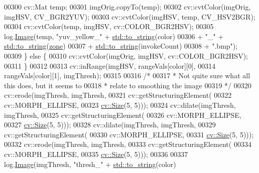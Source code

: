 \begin{DoxyCode}
00300                 cv::Mat temp;
00301                 imgOrig.copyTo(temp);
00302                 cv::cvtColor(imgOrig, imgHSV, CV\_BGR2YUV);
00303                 cv::cvtColor(imgHSV, temp, CV\_HSV2BGR);
00304                 cv::cvtColor(temp, imgHSV, cv::COLOR\_BGR2HSV);
00305                 log.\hyperlink{classChipChipArray_1_1Log_a65bbab057c8b1453f9e4efcfee7522c4}{Image}(temp, \textcolor{stringliteral}{"yuv\_yellow\_"} + \hyperlink{namespacestd_aa5ddf582a1c96ffe258c997be9a294a3}{std::to\_string}(color)
00306                         + \textcolor{stringliteral}{"\_"} + \hyperlink{namespacestd_aa5ddf582a1c96ffe258c997be9a294a3}{std::to\_string}(\hyperlink{classChipChipArray_1_1Grabber_ab57efe6e0b6f369b19528285a278d967}{zone})
00307                         + \hyperlink{namespacestd_aa5ddf582a1c96ffe258c997be9a294a3}{std::to\_string}(invokeCount)
00308                         + \textcolor{stringliteral}{".bmp"});
00309             \} \textcolor{keywordflow}{else} \{
00310                 cv::cvtColor(imgOrig, imgHSV, cv::COLOR\_BGR2HSV);
00311             \}
00312 
00313             cv::inRange(imgHSV, rangeVals[color][0],
00314                     rangeVals[color][1], imgThresh);
00315 
00316             \textcolor{comment}{/* }
00317 \textcolor{comment}{             * Not quite sure what all this does, but it seems to}
00318 \textcolor{comment}{             * relate to smoothing the image}
00319 \textcolor{comment}{             */}
00320             cv::erode(imgThresh, imgThresh,
00321                     cv::getStructuringElement(
00322                         cv::MORPH\_ELLIPSE,
00323                         \hyperlink{definitions_8hpp_a9809446fd16a744b6df9808293f14153}{cv::Size}(5, 5)));
00324             cv::dilate(imgThresh, imgThresh,
00325                     cv::getStructuringElement(
00326                         cv::MORPH\_ELLIPSE,
00327                         \hyperlink{definitions_8hpp_a9809446fd16a744b6df9808293f14153}{cv::Size}(5, 5)));
00328             cv::dilate(imgThresh, imgThresh,
00329                     cv::getStructuringElement(
00330                         cv::MORPH\_ELLIPSE,
00331                         \hyperlink{definitions_8hpp_a9809446fd16a744b6df9808293f14153}{cv::Size}(5, 5)));
00332             cv::erode(imgThresh, imgThresh,
00333                     cv::getStructuringElement(
00334                         cv::MORPH\_ELLIPSE,
00335                         \hyperlink{definitions_8hpp_a9809446fd16a744b6df9808293f14153}{cv::Size}(5, 5)));
00336 
00337             log.\hyperlink{classChipChipArray_1_1Log_a65bbab057c8b1453f9e4efcfee7522c4}{Image}(imgThresh, \textcolor{stringliteral}{"thresh\_"} + \hyperlink{namespacestd_aa5ddf582a1c96ffe258c997be9a294a3}{std::to\_string}(color)

\end{DoxyCode}
